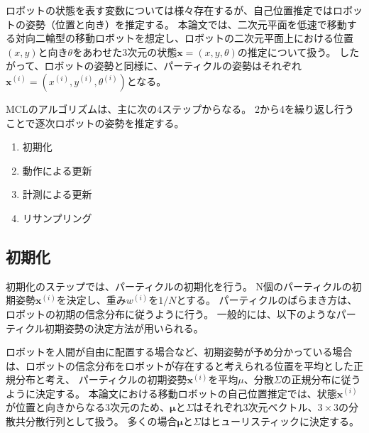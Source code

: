 ロボットの状態を表す変数については様々存在するが、自己位置推定ではロボットの姿勢（位置と向き）を推定する。
本論文では、二次元平面を低速で移動する対向二輪型の移動ロボットを想定し、ロボットの二次元平面上における位置$(x, y)$と向き$\theta$をあわせた3次元の状態$\bm{x} = (x, y, \theta)$の推定について扱う。
したがって、ロボットの姿勢と同様に、パーティクルの姿勢はそれぞれ$\bm{x}^{(i)} = (x^{(i)}, y^{(i)}, \theta^{(i)})$となる。


MCLのアルゴリズムは、主に次の4ステップからなる。
2から4を繰り返し行うことで逐次ロボットの姿勢を推定する。
\begin{enumerate}
  \item 初期化
  \item 動作による更新
  \item 計測による更新
  \item リサンプリング
\end{enumerate}




\subsection{初期化}

初期化のステップでは、パーティクルの初期化を行う。
N個のパーティクルの初期姿勢$\bm{x}^{(i)}$を決定し、重み$w^{(i)}$を$1/N$とする。
パーティクルのばらまき方は、ロボットの初期の信念分布に従うように行う。
一般的には、以下のようなパーティクル初期姿勢の決定方法が用いられる。

ロボットを人間が自由に配置する場合など、初期姿勢が予め分かっている場合は、ロボットの信念分布をロボットが存在すると考えられる位置を平均とした正規分布と考え、
パーティクルの初期姿勢$\bm{x}^{(i)}$を平均$\mu$、分散$\Sigma$の正規分布に従うように決定する。
本論文における移動ロボットの自己位置推定では、状態$\bm{x}^{(i)}$が位置と向きからなる3次元のため、$\bm{\mu}$と$\Sigma$はそれぞれ3次元ベクトル、$3\times3$の分散共分散行列として扱う。
多くの場合$\bm{\mu}$と$\Sigma$はヒューリスティックに決定する。

